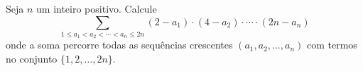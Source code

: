Seja $n$ um inteiro positivo. Calcule
\[\sum_{1 \le a_1 < a_2 < \cdots < a_n \le 2n} (2 - a_1)\cdot(4 - a_2)\cdot\cdots\cdot(2n - a_n)\]
onde a soma percorre todas as sequências crescentes $(a_1, a_2, \dots, a_n)$ com termos no conjunto $\{1, 2, \dots, 2n\}$.
